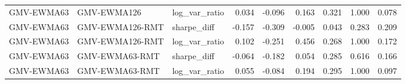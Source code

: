 \begin{table}[t]
{\begin{tabular}{lllrrrrrr}
GMV-EWMA63 & GMV-EWMA126 & log\_var\_ratio & 0.034 & -0.096 & 0.163 & 0.321 & 1.000 & 0.078 \\
GMV-EWMA63 & GMV-EWMA126-RMT & sharpe\_diff & -0.157 & -0.309 & -0.005 & 0.043 & 0.283 & 0.209 \\
GMV-EWMA63 & GMV-EWMA126-RMT & log\_var\_ratio & 0.102 & -0.251 & 0.456 & 0.268 & 1.000 & 0.172 \\
GMV-EWMA63 & GMV-EWMA63-RMT & sharpe\_diff & -0.064 & -0.182 & 0.054 & 0.285 & 0.616 & 0.166 \\
GMV-EWMA63 & GMV-EWMA63-RMT & log\_var\_ratio & 0.055 & -0.084 & 0.194 & 0.295 & 1.000 & 0.097 \\
\bottomrule
\end{tabular}}
\end{table}
